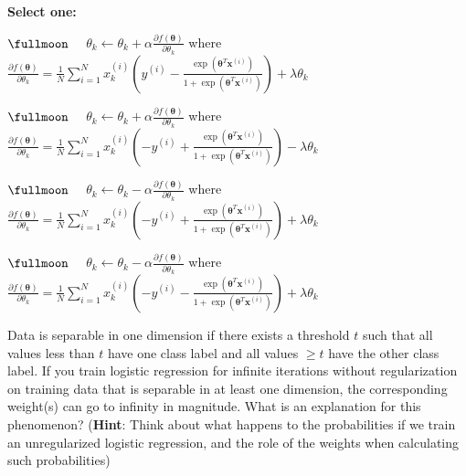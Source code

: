 \documentclass[11pt,addpoints,answers]{exam}
\newcommand{\emptycircle}{{\LARGE $\fullmoon$}\ \ }
\newcommand{\filledcircle}{{\LARGE $\newmoon$}\ \ }
\newcommand{\xv}{\mathbf{x}}
\newcommand{\thetav     }{\boldsymbol \theta     }
\begin{document}
\begin{questions}
    \textbf{Select one:}
    \begin{list}{}
        \item 
            \emptycircle 
            $\theta_k\leftarrow \theta_k + \alpha \frac{\partial f(\thetav)}{\partial \theta_k}$ where 
            $ \frac{\partial f(\thetav)}{\partial \theta_k}=\frac{1}{N}\sum_{i=1}^N x^{(i)}_k\left(y^{(i)} -\frac{\exp(\thetav^T \xv^{(i)})}{1+\exp(\thetav^T \xv^{(i)})} \right)+\lambda \theta_k$
        \item 
            \emptycircle 
            $\theta_k\leftarrow \theta_k + \alpha \frac{\partial f(\thetav)}{\partial \theta_k}$ where 
            $ \frac{\partial f(\thetav)}{\partial \theta_k}=\frac{1}{N}\sum_{i=1}^N x^{(i)}_k\left(-y^{(i)} +\frac{\exp(\thetav^T \xv^{(i)})}{1+\exp(\thetav^T \xv^{(i)})} \right)-\lambda \theta_k$
        \item 
            \emptycircle 
            $\theta_k\leftarrow \theta_k - \alpha \frac{\partial f(\thetav)}{\partial \theta_k}$ where 
            $ \frac{\partial f(\thetav)}{\partial \theta_k}=\frac{1}{N}\sum_{i=1}^N x^{(i)}_k\left(-y^{(i)} +\frac{\exp(\thetav^T \xv^{(i)})}{1+\exp(\thetav^T \xv^{(i)})} \right)+\lambda \theta_k$
        \item 
            \emptycircle 
            $\theta_k\leftarrow \theta_k - \alpha \frac{\partial f(\thetav)}{\partial \theta_k}$ where 
            $ \frac{\partial f(\thetav)}{\partial \theta_k}=\frac{1}{N}\sum_{i=1}^N x^{(i)}_k\left(-y^{(i)} -\frac{\exp(\thetav^T \xv^{(i)})}{1+\exp(\thetav^T \xv^{(i)})} \right)+\lambda \theta_k$
    \end{list}

    
    \newpage
    \question[2] Data is separable in one dimension if there exists a threshold $t$ such that all values less than $t$ have one class label and all values $\geq t$ have the other class label. If you train logistic regression for infinite iterations without 
    regularization on training data that is separable in at least one dimension,
    the corresponding weight(s) can go to infinity in magnitude. What is an explanation for this phenomenon? (\textbf{Hint}: Think about what happens to the probabilities if we train an unregularized logistic regression, and the role of the weights when calculating such probabilities)


\end{questions}
\end{document}
